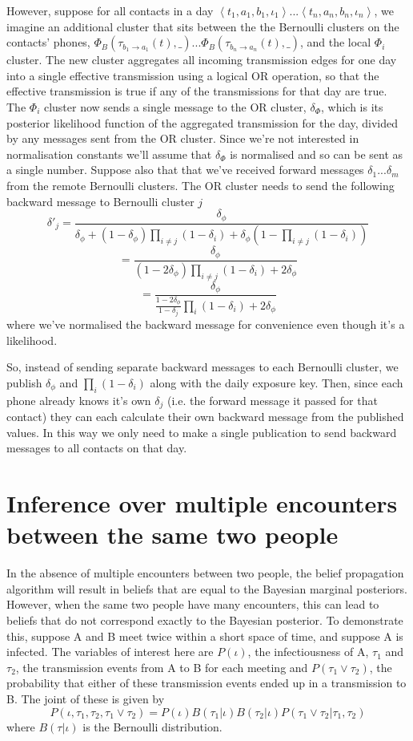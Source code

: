 \documentclass{article}
\begin{document}
However, suppose for all contacts in a day $\left<t_1,a_1,b_1,\iota_1\right>...\left<t_n,a_n,b_n,\iota_n\right>$, we imagine an additional cluster that sits between the the Bernoulli clusters on the contacts' phones, $ \Phi_B(\tau_{b_1\rightarrow a_1}(t),\_) ... \Phi_B(\tau_{b_n\rightarrow a_n}(t),\_)$, and the local $\Phi_i$ cluster. The new cluster aggregates all incoming transmission edges for one day into a single effective transmission using a logical OR operation, so that the effective transmission is true if any of the transmissions for that day are true. The $\Phi_i$ cluster now sends a single message to the OR cluster, $\delta_\Phi$, which is its posterior likelihood function of the aggregated transmission for the day, divided by any messages sent from the OR cluster. Since we're not interested in normalisation constants we'll assume that $\delta_\Phi$ is normalised and so can be sent as a single number. Suppose also that that we've received forward messages $\delta_1...\delta_m$ from the remote Bernoulli clusters. The OR cluster needs to send the following backward message to Bernoulli cluster $j$
\[
\delta'_j = \frac{\delta_\phi}{\delta_\phi + (1-\delta_\phi)\prod_{i\ne j}(1-\delta_i) + \delta_\phi(1 - \prod_{i\ne j}(1-\delta_i))}
\]
\[
= \frac{\delta_\phi}{ (1-2\delta_\phi)\prod_{i\ne j}(1-\delta_i) + 2\delta_\phi}
\]
\[
= \frac{\delta_\phi}{ \frac{1-2\delta_\phi}{1-\delta_j}\prod_{i}(1-\delta_i) + 2\delta_\phi}
\]
where we've normalised the backward message for convenience even though it's a likelihood.

So, instead of sending separate backward messages to each Bernoulli cluster, we publish $\delta_\phi$ and $\prod_i (1-\delta_i)$ along with the daily exposure key. Then, since each phone already knows it's own $\delta_j$ (i.e. the forward message it passed for that contact) they can each calculate their own backward message from the published values. In this way we only need to make a single publication to send backward messages to all contacts on that day.

\section{Inference over multiple encounters between the same two people}
In the absence of multiple encounters between two people, the belief propagation algorithm will result in beliefs that are equal to the Bayesian marginal posteriors. However, when the same two people have many encounters, this can lead to beliefs that do not correspond exactly to the Bayesian posterior. To demonstrate this, suppose A and B meet twice within a short space of time, and suppose A is infected. The variables of interest here are $P(\iota)$, the infectiousness of A, $\tau_1$ and $\tau_2$, the transmission events from A to B for each meeting and  $P(\tau_1 \vee \tau_2)$, the probability that either of these transmission events ended up in a transmission to B. The joint of these is given by
\[
P(\iota, \tau_1, \tau_2, \tau_1 \vee \tau_2) = P(\iota)B(\tau_1|\iota)B(\tau_2|\iota)P(\tau_1 \vee \tau_2|\tau_1,\tau_2)
\]
where $B(\tau|\iota)$ is the Bernoulli distribution.
\end{document}

